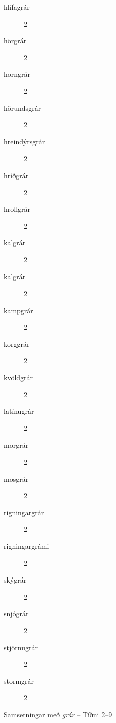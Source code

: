 \documentclass[../samsetningasafn.tex]{subfiles}
\begin{document}
\begin{bigwordlist}
\begin{footnotesize}
\begin{multicols}{4}
\begin{description}
		\item [hlífagrár]	2
		\item [hörgrár]		2
		\item [horngrár]		2
		\item [hörundsgrár]		2
		\item [hreindýrsgrár]	2
		\item [hríðgrár]		2
		\item [hrollgrár]		2
		\item [kalgrár]		2
		\item [kalgrár]		2
		\item [kampgrár]	2
		\item [korggrár]		2
		\item [kvöldgrár]		2
		\item [latínugrár]	2
		\item [morgrár]		2
		\item [mosgrár]		2
		\item [rigningargrár]	2
		\item [rigningargrámi]	2
		\item [skýgrár]	2
		\item [snjógrár]		2
		\item [stjörnugrár]	2
		\item [stormgrár]	2
	\end{description}
\end{multicols}
\end{footnotesize}
	
\label{listi:grar9}
\caption{Samsetningar með \textit{grár} -- Tíðni 2--9}
\end{bigwordlist}
\end{document}
